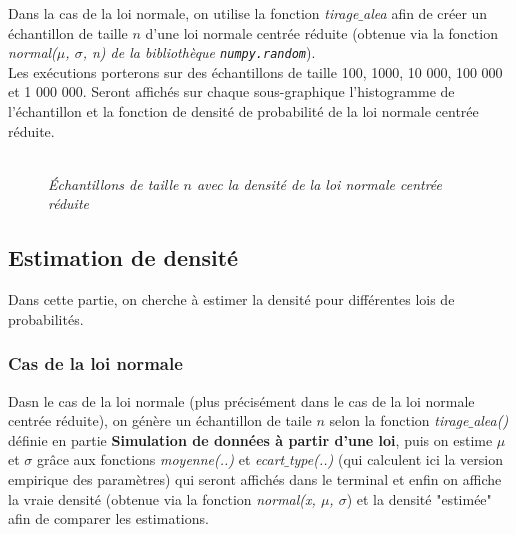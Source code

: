 \documentclass{article}      %
\begin{document}
Dans la cas de la loi normale, on utilise la fonction \textit{tirage$\_$alea} afin de créer un échantillon de taille $n$ d'une loi normale centrée réduite (obtenue via la fonction \textit{normal($\mu$, $\sigma$, n) de la bibliothèque \texttt{numpy.random}}).\\
Les exécutions porterons sur des échantillons de taille 100, 1000, 10 000, 100 000 et 1 000 000.
Seront affichés sur chaque sous-graphique l'histogramme de l'échantillon et la fonction de densité de probabilité de la loi normale centrée réduite.\\
\begin{figure}[H]
	\centering
	\\
	\textit{Échantillons de taille $n$ avec la densité de la loi normale centrée réduite}
\end{figure}

\subsection{Estimation de densité}
Dans cette partie, on cherche à estimer la densité pour différentes lois de probabilités.\\

\subsubsection{Cas de la loi normale}
Dasn le cas de la loi normale (plus précisément dans le cas de la loi normale centrée réduite), on génère un échantillon de taile $n$ selon la fonction \textit{tirage$\_$alea()} définie en partie \textbf{Simulation de données à partir d'une loi}, puis on estime $\mu$ et $\sigma$ grâce aux fonctions \textit{moyenne(..)} et \textit{ecart$\_$type(..)} (qui calculent ici la version empirique des paramètres) qui seront affichés dans le terminal et enfin on affiche la vraie densité (obtenue via la fonction \textit{normal(x, $\mu$, $\sigma$}) et la densité "estimée" afin de comparer les estimations.\\
\end{document}
